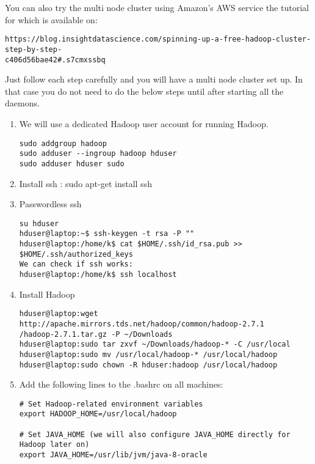 \documentclass[11pt]{article}
\begin{document}
You can also try the multi node cluster using Amazon's AWS service the tutorial for which is available on: 
\vspace{-.15in}\begin{verbatim}
https://blog.insightdatascience.com/spinning-up-a-free-hadoop-cluster-step-by-step-
c406d56bae42#.s7cmxssbq
\end{verbatim}\vspace{-.15in}
Just follow each step carefully and you will have a multi node cluster set up.
In that case you do not need to do the below steps until after starting all the daemons.
\begin{enumerate}
\item We will use a dedicated Hadoop user account for running Hadoop.
\vspace{-.15in}\begin{verbatim}
sudo addgroup hadoop
sudo adduser --ingroup hadoop hduser
sudo adduser hduser sudo
\end{verbatim}\vspace{-.15in}
\item Install ssh :
sudo apt-get install ssh
\item Passwordless ssh
\vspace{-.15in}\begin{verbatim}
su hduser
hduser@laptop:~$ ssh-keygen -t rsa -P ""
hduser@laptop:/home/k$ cat $HOME/.ssh/id_rsa.pub >> $HOME/.ssh/authorized_keys
We can check if ssh works:
hduser@laptop:/home/k$ ssh localhost
\end{verbatim}\vspace{-.15in}
\item Install Hadoop
\vspace{-.15in}\begin{verbatim}
hduser@laptop:wget http://apache.mirrors.tds.net/hadoop/common/hadoop-2.7.1
/hadoop-2.7.1.tar.gz -P ~/Downloads
hduser@laptop:sudo tar zxvf ~/Downloads/hadoop-* -C /usr/local
hduser@laptop:sudo mv /usr/local/hadoop-* /usr/local/hadoop
hduser@laptop:sudo chown -R hduser:hadoop /usr/local/hadoop
\end{verbatim}\vspace{-.15in}

\item Add the following lines to the .bashrc on all machines:
\vspace{-.15in}\begin{verbatim}
# Set Hadoop-related environment variables
export HADOOP_HOME=/usr/local/hadoop

# Set JAVA_HOME (we will also configure JAVA_HOME directly for Hadoop later on)
export JAVA_HOME=/usr/lib/jvm/java-8-oracle


\end{verbatim}
\end{enumerate}
\end{document}
